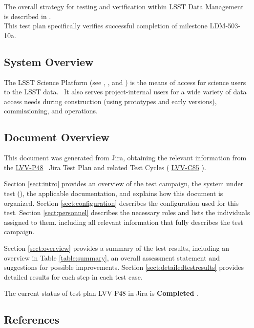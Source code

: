 \documentclass[DM,STR,toc]{lsstdoc}
\begin{document}
The overall strategy for testing and verification within LSST Data
Management is described in .\\
This test plan specifically verifies successful completion of milestone
LDM-503-10a.



\subsection{System Overview}
\label{sect:systemoverview}

The LSST Science Platform (see , , and ) is the
means of access for science users to the LSST data. ~It also serves
project-internal users for a wide variety of data access needs during
construction (using prototypes and early versions), commissioning, and
operations.


\subsection{Document Overview}
\label{sect:docoverview}

This document was generated from Jira, obtaining the relevant information from the 
\href{https://jira.lsstcorp.org/secure/Tests.jspa#/testPlan/LVV-P48}{LVV-P48}
~Jira Test Plan and related Test Cycles (
  \href{https://jira.lsstcorp.org/secure/Tests.jspa#/testCycle/LVV-C85}{LVV-C85}
).

Section \ref{sect:intro} provides an overview of the test campaign, the system under test (\product{}),
the applicable documentation, and explains how this document is organized.
Section \ref{sect:configuration}  describes the configuration used for this test.
Section \ref{sect:personnel} describes the necessary roles and lists the individuals assigned to them.
including all relevant information that fully describes the test campaign.

Section \ref{sect:overview} provides a summary of the test results, including an overview in Table \ref{table:summary},
an overall assessment statement and suggestions for possible improvements.
Section \ref{sect:detailedtestresults} provides detailed results for each step in each test case.

The current status of test plan LVV-P48 in Jira is \textbf{ Completed }.

\subsection{References}
\label{sect:references}
\renewcommand{\refname}{}

\end{document}
